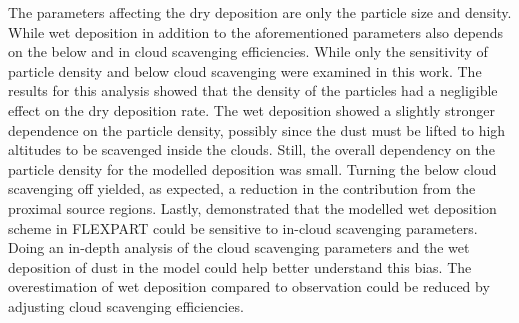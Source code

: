 



The parameters affecting the dry deposition are only the particle size and density. While wet deposition in addition to the aforementioned parameters also depends on the below and in cloud scavenging efficiencies.
While only the sensitivity of particle density and below cloud scavenging were examined in this work. The results for this analysis showed that the density of the particles had a negligible effect on the dry deposition rate. The wet deposition showed a slightly stronger dependence on the particle density, 
possibly since the dust must be lifted to high altitudes to be scavenged inside the clouds. Still, the overall dependency on the particle density for the modelled deposition was small. 
Turning the below cloud scavenging off yielded, as expected, a reduction in the contribution from the proximal source regions.
Lastly, \textcite{flexpart_wetdep} demonstrated that the modelled wet deposition scheme in FLEXPART could be sensitive to in-cloud scavenging parameters. Doing an in-depth analysis of the cloud scavenging parameters and the wet deposition  of dust in the model could help better understand this bias. The overestimation of wet deposition compared to observation could be reduced by adjusting cloud scavenging efficiencies.

